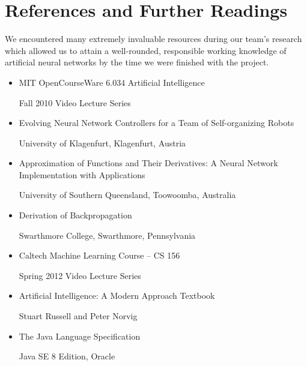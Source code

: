 \documentclass[letterpaper, 10pt]{article}
\begin{document}
\section{References and Further Readings}
	We encountered many extremely invaluable resources during our team's research which allowed us to attain a well-rounded, responsible working knowledge of artificial neural networks by the time we were finished with the project.

	\large
	\vspace{0.65cm}

	\begin{itemize}
		\item MIT OpenCourseWare 6.034 Artificial Intelligence
		
			\hspace{1.5cm} Fall 2010 Video Lecture Series
		\item Evolving Neural Network Controllers for a Team of Self-organizing Robots
		
			\hspace{1.5cm} University of Klagenfurt, Klagenfurt, Austria
		\item Approximation of Functions and Their Derivatives: A Neural Network Implementation with Applications
		
			\hspace{1.5cm} University of Southern Queensland, Toowoomba, Australia
		\item Derivation of Backpropagation
		
			\hspace{1.5cm} Swarthmore College, Swarthmore, Pennsylvania
		\item Caltech Machine Learning Course -- CS 156
		
			\hspace{1.5cm} Spring 2012 Video Lecture Series
		\item Artificial Intelligence: A Modern Approach Textbook
			
			\hspace{1.5cm} Stuart Russell and Peter Norvig
		\item The Java Language Specification
			
			\hspace{1.5cm} Java SE 8 Edition, Oracle
	\end{itemize}
\end{document}
